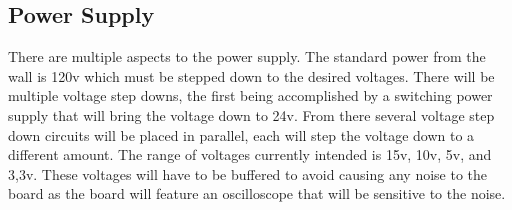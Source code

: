 \subsection{Power Supply}
There are multiple aspects to the power supply. The standard power from the wall is 120v which must be stepped down to the desired voltages. There will be multiple voltage step downs, the first being accomplished by a switching power supply that will bring the voltage down to 24v. From there several voltage step down circuits will be placed in parallel, each will step the voltage down to a different amount. The range of voltages currently intended is 15v, 10v, 5v, and 3,3v. These voltages will have to be buffered to avoid causing any noise to the board as the board will feature an oscilloscope that will be sensitive to the noise.